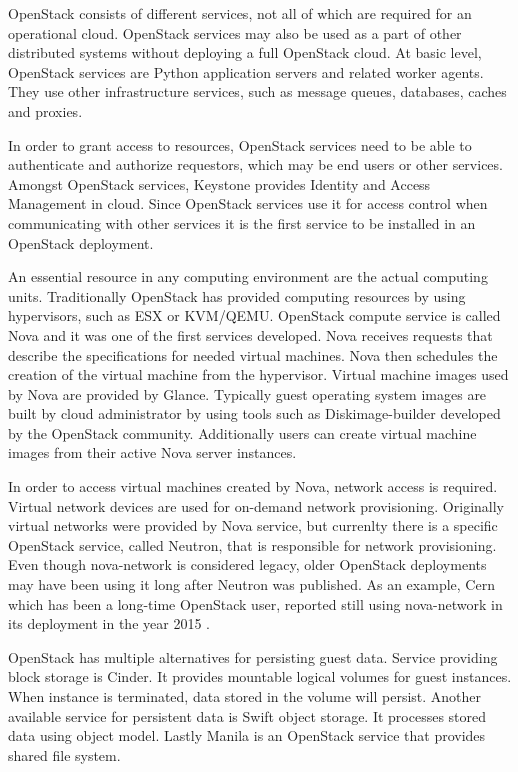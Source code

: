 OpenStack consists of different services, not all of which are required for an
operational cloud. OpenStack services may also be used as a part of other
distributed systems without deploying a full OpenStack cloud. At basic level,
OpenStack services are Python application servers and related worker agents.
They use other infrastructure services, such as message queues, databases,
caches and proxies.

In order to grant access to resources, OpenStack services need to be able to
authenticate and authorize requestors, which may be end users or other
services. Amongst OpenStack services, Keystone provides Identity and Access
Management in cloud. Since OpenStack services use it for access control when
communicating with other services it is the first service to be installed in
an OpenStack deployment.

An essential resource in any computing environment are the actual computing
units. Traditionally OpenStack has provided computing resources by using
hypervisors, such as ESX or KVM/QEMU. OpenStack compute service is called Nova
and it was one of the first services developed. Nova receives requests that
describe the specifications for needed virtual machines. Nova then schedules
the creation of the virtual machine from the hypervisor. Virtual machine images
used by Nova are provided by Glance. Typically guest operating system images
are built by cloud administrator by using tools such as Diskimage-builder 
developed by the OpenStack community. Additionally users can create virtual
machine images from their active Nova server instances.

In order to access virtual machines created by Nova, network access is
required. Virtual network devices are used for on-demand network provisioning.
Originally virtual networks were provided by Nova service, but currenlty there
is a specific OpenStack service, called Neutron, that is responsible for
network provisioning. Even though nova-network is considered legacy, older
OpenStack deployments may have been using it long after Neutron was published.
As an example, Cern which has been a long-time OpenStack user, reported still
using nova-network in its deployment in the year 2015 \cite{bell2015scaling}.

OpenStack has multiple alternatives for persisting guest data. Service
providing block storage is Cinder. It provides mountable logical volumes for
guest instances. When instance is terminated, data stored in the volume will
persist. Another available service for persistent data is Swift object storage.
It processes stored data using object model. Lastly Manila is an OpenStack
service that provides shared file system.

